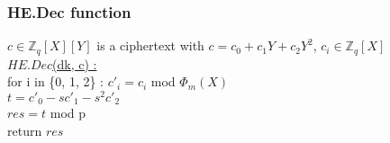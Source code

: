 \subsubsection{HE.Dec function}
$c \in \mathbb{Z}_q[X][Y]$ is a ciphertext with $c=c_0 + c_1 Y + c_2 Y^2$, $c_i \in \mathbb{Z}_q[X]$ \\
\underline{$HE.Dec$(dk, c) :} \\
\tabNormal for i in \{0, 1, 2\} : 
\tabOne $c'_i = c_i$ mod $\Phi_m(X) $ \\
\tabNormal $t = c'_0 - s c'_1 - s^2 c'_2$ \\
\tabNormal $res = t$ mod p \\
\tabNormal return $res$ 